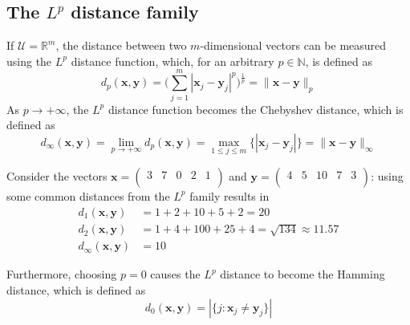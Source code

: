 \documentclass{report}
\begin{document}
\subsection{The $L^p$ distance family}
If $\displaystyle \mathcal{U} = \mathbb{R}^m$, the distance between two $\displaystyle m$-dimensional vectors can be measured using the $\displaystyle L^p$ distance function, which, for an arbitrary $\displaystyle p \in \mathbb{N}$, is defined as
\[d_p(\mathbf{x}, \mathbf{y}) = \Bigg(\sum_{j = 1}^m |\mathbf{x}_j - \mathbf{y}_j|^p\Bigg)^{\frac{1}{p}} = \lVert \mathbf{x} - \mathbf{y} \rVert_p\]
As $\displaystyle p \to +\infty$, the $\displaystyle L^p$ distance function becomes the Chebyshev distance, which is defined as
\[d_{\infty}(\mathbf{x}, \mathbf{y}) = \lim_{p \to +\infty} d_p(\mathbf{x}, \mathbf{y}) = \max_{1 \leq j \leq m}\{|\mathbf{x}_j - \mathbf{y}_j|\} = \lVert \mathbf{x} - \mathbf{y} \rVert_{\infty}\]
\begin{examplebox}
    Consider the vectors $\displaystyle \mathbf{x} = \begin{pmatrix}
        3 & 7 & 0 & 2 & 1 \\
    \end{pmatrix}$ and $\displaystyle \mathbf{y} = \begin{pmatrix}
        4 & 5 & 10 & 7 & 3 \\
    \end{pmatrix}$: using some common distances from the $\displaystyle L^p$ family results in
    \begin{align*}
        d_1(\mathbf{x}, \mathbf{y}) &= 1 + 2 + 10 + 5 + 2 = 20 \\
        d_2(\mathbf{x}, \mathbf{y}) &= 1 + 4 + 100 + 25 + 4 = \sqrt{134} \approx 11.57 \\
        d_{\infty}(\mathbf{x}, \mathbf{y}) &= 10
    \end{align*}
\end{examplebox}
\noindent Furthermore, choosing $\displaystyle p = 0$ causes the $\displaystyle L^p$ distance to become the Hamming distance, which is defined as
\[d_0(\mathbf{x}, \mathbf{y}) = |\{j : \mathbf{x}_j \neq \mathbf{y}_j\}|\]
\end{document}
